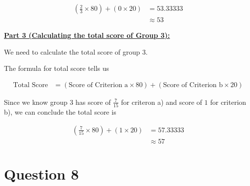 \documentclass[12pt]{article}
\begin{document}
\begin{mdframed}
    \color{red}
    \setcounter{equation}{0}
    \begin{align}
        (\frac{2}{3} \times 80) + (0 \times 20) &= 53.33333\\
        &\approx 53
    \end{align}
    \color{black}

    \underline{\textbf{Part 3 (Calculating the total score of Group 3):}}

    \bigskip

    We need to calculate the total score of group 3.

    \bigskip

    \color{red}
    The formula for total score tells us

    \begin{align}
        \text{Total Score} &= (\text{Score of Criterion a} \times 80) + (\text{Score of Criterion b} \times 20)
    \end{align}
    \color{black}

    \bigskip

    Since we know \color{red}group 3 has score of $\frac{7}{15}$ for criteron a) and score of $1$ for
    criterion b)\color{black}, we can conclude the total score is

    \color{red}
    \setcounter{equation}{0}
    \begin{align}
        (\frac{7}{15} \times 80) + (1 \times 20) &= 57.33333\\
        &\approx 57
    \end{align}
    \color{black}

\end{mdframed}

\section*{Question 8}

\bigskip
\end{document}
